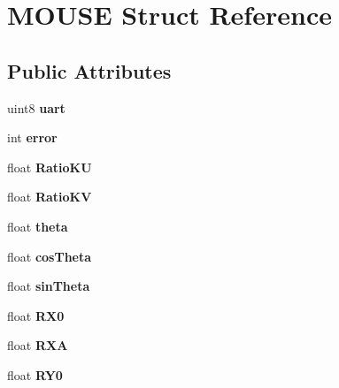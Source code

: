 \hypertarget{structMOUSE}{}\section{M\+O\+U\+SE Struct Reference}
\label{structMOUSE}
\subsection*{Public Attributes}
\begin{DoxyCompactItemize}
\item 
\mbox{\label{structMOUSE_a60951d6b47dc0b967d358af08bda26c7}} 
uint8 {\bfseries uart}
\item 
\mbox{\label{structMOUSE_aacaa90c9ecabf341b670dc6997e53c35}} 
int {\bfseries error}
\item 
\mbox{\label{structMOUSE_a8103040ea7c34545a9448d3105293a8c}} 
float {\bfseries Ratio\+KU}
\item 
\mbox{\label{structMOUSE_a75e7ee1e318c3740f26a43201a455f2a}} 
float {\bfseries Ratio\+KV}
\item 
\mbox{\label{structMOUSE_a1795c9fdb98b1d73d4106f55eac03a4d}} 
float {\bfseries theta}
\item 
\mbox{\label{structMOUSE_acbba1b7e4a5204bf43c2a052ae34e156}} 
float {\bfseries cos\+Theta}
\item 
\mbox{\label{structMOUSE_a4a2aef76c19adc18fc276a2ae76198f6}} 
float {\bfseries sin\+Theta}
\item 
\mbox{\label{structMOUSE_a00cefae0bf72bacbb86bec42f8b07c13}} 
float {\bfseries R\+X0}
\item 
\mbox{\label{structMOUSE_a12e927674cd898fefdd6f99b5dc2e9be}} 
float {\bfseries R\+XA}
\item 
\mbox{\label{structMOUSE_a4c6f6732ea3c52acd48c5e9a2e411996}} 
float {\bfseries R\+Y0}
\item 
\mbox{\label{structMOUSE_a9088e774bfb0deaf97ff0c873e05fedf}} 

\end{DoxyCompactItemize}
